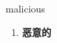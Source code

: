 
\begin{frame}
{\huge malicious}
\begin{center}
\begin{enumerate}\Large
  \item \textbf{恶意的}
\end{enumerate}
\end{center}
\end{frame}
